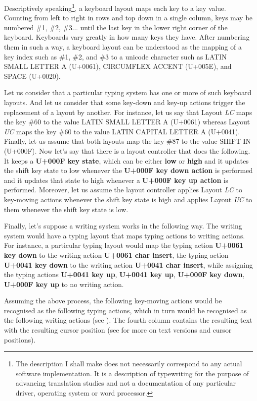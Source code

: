\documentclass[output=paper]{LSP/langsci}
\begin{document}
Descriptively speaking\footnote{The description I shall make does not necessarily correspond to any actual software implementation. It is a description of typewriting for the purpose of advancing translation studies and not a documentation of any particular driver, operating system or word processor.}, a keyboard layout maps each key to a key value. Counting from left to right in rows and top down in a single column, keys may be numbered \#1, \#2, \#3... until the last key in the lower right corner of the keyboard. Keyboards vary greatly in how many keys they have. After numbering them in such a way, a keyboard layout can be understood as the mapping of a key index such as \#1, \#2, and \#3 to a unicode character such as LATIN SMALL LETTER A (U+0061), CIRCUMFLEX ACCENT (U+005E), and SPACE (U+0020).

\largerpage
Let us consider that a particular typing system has one or more of such keyboard layouts. And let us consider that some key-down and key-up actions trigger the replacement of a layout by another. For instance, let us say that Layout \emph{LC} maps the key \#60 to the value LATIN SMALL LETTER A (U+0061) whereas Layout \emph{UC} maps the key \#60 to the value LATIN CAPITAL LETTER A (U+0041). Finally, let us assume that both layouts map the key \#87 to the value SHIFT IN (U+000F). Now let’s say that there is a layout controller that does the following. It keeps a \textbf{U+000F key state}, which can be either \textbf{low} or \textbf{high} and it updates the shift key state to low whenever the \textbf{U+000F key down action} is performed and it updates that state to high whenever a \textbf{U+000F key up action} is performed. Moreover, let us assume the layout controller applies Layout \emph{LC} to key-moving actions whenever the shift key state is high and applies Layout \emph{UC} to them whenever the shift key state is low.

\newpage 
Finally, let’s suppose a writing system works in the following way. The writing system would have a typing layout that maps typing actions to writing actions. For instance, a particular typing layout would map the typing action \textbf{U+0061 key down} to the writing action \textbf{U+0061 char insert}, the typing action \textbf{U+0041 key down} to the writing action \textbf{U+0041 char insert}, while assigning the typing actions \textbf{U+0041 key up}, \textbf{U+0041 key up}, \textbf{U+000F key down}, \textbf{U+000F key up} to no writing action.

Assuming the above process, the following key-moving actions would be recognised as the following typing actions, which in turn would be recognised as the following writing actions (see ). The fourth column contains the resulting text with the resulting cursor position (see  for more on text versions and cursor positions).
\end{document}
